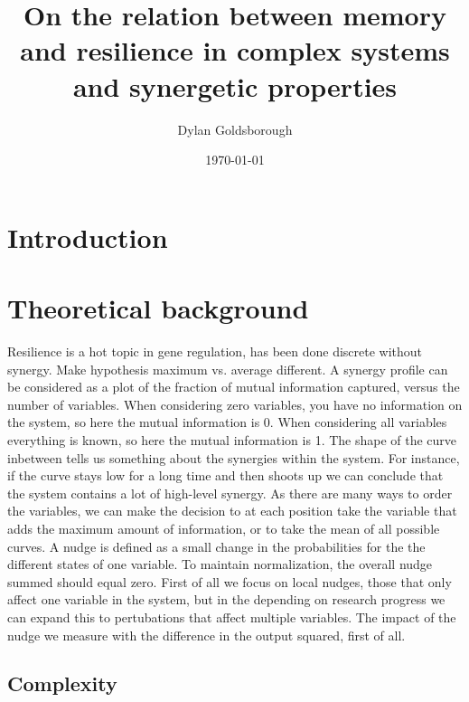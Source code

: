 \documentclass{article}
\title{On the relation between memory and resilience in complex systems and synergetic properties}
\author{Dylan Goldsborough}
\date{\today}
\providecommand{\main}{.}
\def\biblio{ }
\begin{document}
\def\biblio{}

\maketitle



\section{Introduction}



\section{Theoretical background}

Resilience is a hot topic in gene regulation, has been done discrete without synergy\cite{peixoto2012emergence}.
Make hypothesis maximum vs. average different.
A synergy profile can be considered as a plot of the fraction of mutual information captured, versus the number of variables. 
When considering zero variables, you have no information on the system, so here the mutual information is 0.
When considering all variables everything is known, so here the mutual information is
1. 
The shape of the curve inbetween tells us something about the synergies within the system.
For instance, if the curve stays low for a long time and then shoots up we can conclude that the system contains a lot of high-level synergy. As there are many ways to order the variables, we can make the decision to at each position take the variable that adds the maximum amount of information, or to take the mean of all possible curves.
A nudge is defined as a small change in the probabilities for the the different states of one variable. To maintain normalization, the overall nudge summed should equal zero.
First of all we focus on local nudges, those that only affect one variable in the system, but in the depending on research progress we can expand this to pertubations that affect multiple variables. 
The impact of the nudge we measure with the difference in the output squared, first of all.

\subsection{Complexity}
\end{document}
